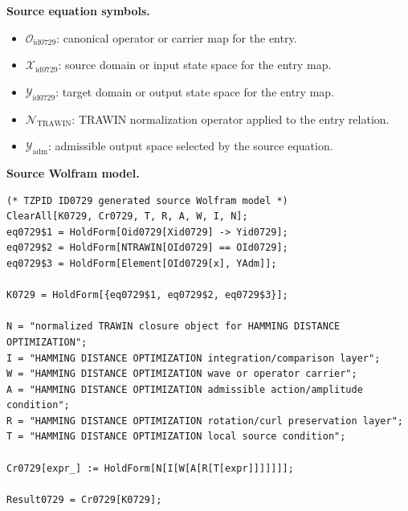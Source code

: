 \begin{minipage}[t]{0.49\linewidth}
\begingroup
\small
\raggedright
\textbf{Source equation symbols.}\par
\begin{itemize}[leftmargin=1.35em,itemsep=1pt,topsep=1pt,parsep=0pt]
    \item $\mathcal{O}_{\mathrm{id0729}}$: canonical operator or carrier map for the entry.
    \item $\mathcal{X}_{\mathrm{id0729}}$: source domain or input state space for the entry map.
    \item $\mathcal{Y}_{\mathrm{id0729}}$: target domain or output state space for the entry map.
    \item $\mathcal{N}_{\mathrm{TRAWIN}}$: TRAWIN normalization operator applied to the entry relation.
    \item $\mathcal{Y}_{\mathrm{adm}}$: admissible output space selected by the source equation.
\end{itemize}
\endgroup
\end{minipage}\hfill
\begin{minipage}[t]{0.47\linewidth}
\begingroup
\scriptsize
\raggedright
\textbf{Source Wolfram model.}\par
\begin{Verbatim}[fontsize=\tiny,breaklines=true,breakanywhere=true]
(* TZPID ID0729 generated source Wolfram model *)
ClearAll[K0729, Cr0729, T, R, A, W, I, N];
eq0729$1 = HoldForm[Oid0729[Xid0729] -> Yid0729];
eq0729$2 = HoldForm[NTRAWIN[OId0729] == OId0729];
eq0729$3 = HoldForm[Element[OId0729[x], YAdm]];

K0729 = HoldForm[{eq0729$1, eq0729$2, eq0729$3}];

N = "normalized TRAWIN closure object for HAMMING DISTANCE OPTIMIZATION";
I = "HAMMING DISTANCE OPTIMIZATION integration/comparison layer";
W = "HAMMING DISTANCE OPTIMIZATION wave or operator carrier";
A = "HAMMING DISTANCE OPTIMIZATION admissible action/amplitude condition";
R = "HAMMING DISTANCE OPTIMIZATION rotation/curl preservation layer";
T = "HAMMING DISTANCE OPTIMIZATION local source condition";

Cr0729[expr_] := HoldForm[N[I[W[A[R[T[expr]]]]]]];

Result0729 = Cr0729[K0729];
\end{Verbatim}
\endgroup
\end{minipage}

